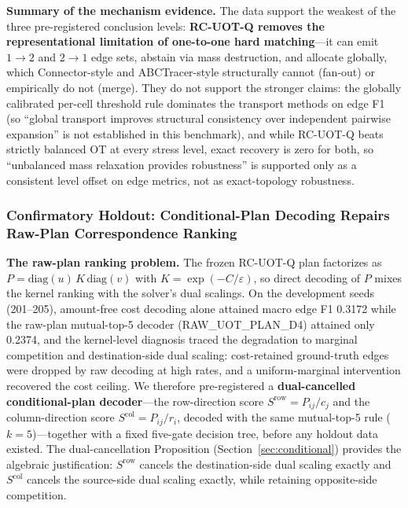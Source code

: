 \textbf{Summary of the mechanism evidence.} The data support the weakest of the three pre-registered conclusion levels: \textbf{RC-UOT-Q removes the representational limitation of one-to-one hard matching}---it can emit $1{\to}2$ and $2{\to}1$ edge sets, abstain via mass destruction, and allocate globally, which Connector-style and ABCTracer-style structurally cannot (fan-out) or empirically do not (merge). They do not support the stronger claims: the globally calibrated per-cell threshold rule dominates the transport methods on edge F1 (so ``global transport improves structural consistency over independent pairwise expansion'' is not established in this benchmark), and while RC-UOT-Q beats strictly balanced OT at every stress level, exact recovery is zero for both, so ``unbalanced mass relaxation provides robustness'' is supported only as a consistent level offset on edge metrics, not as exact-topology robustness.

\subsubsection{Confirmatory Holdout: Conditional-Plan Decoding Repairs Raw-Plan Correspondence Ranking}
\label{sec:confirmatory}

\textbf{The raw-plan ranking problem.} The frozen RC-UOT-Q plan factorizes as $P=\mathrm{diag}(u)\,K\,\mathrm{diag}(v)$ with $K=\exp(-C/\varepsilon)$, so direct decoding of $P$ mixes the kernel ranking with the solver's dual scalings. On the development seeds (201--205), amount-free cost decoding alone attained macro edge F1 0.3172 while the raw-plan mutual-top-5 decoder (RAW\_UOT\_PLAN\_D4) attained only 0.2374, and the kernel-level diagnosis traced the degradation to marginal competition and destination-side dual scaling: cost-retained ground-truth edges were dropped by raw decoding at high rates, and a uniform-marginal intervention recovered the cost ceiling. We therefore pre-registered a \textbf{dual-cancelled conditional-plan decoder}---the row-direction score $S^{\mathrm{row}}=P_{ij}/c_j$ and the column-direction score $S^{\mathrm{col}}=P_{ij}/r_i$, decoded with the same mutual-top-5 rule ($k=5$)---together with a fixed five-gate decision tree, before any holdout data existed. The dual-cancellation Proposition (Section~\ref{sec:conditional}) provides the algebraic justification: $S^{\mathrm{row}}$ cancels the destination-side dual scaling exactly and $S^{\mathrm{col}}$ cancels the source-side dual scaling exactly, while retaining opposite-side competition.

